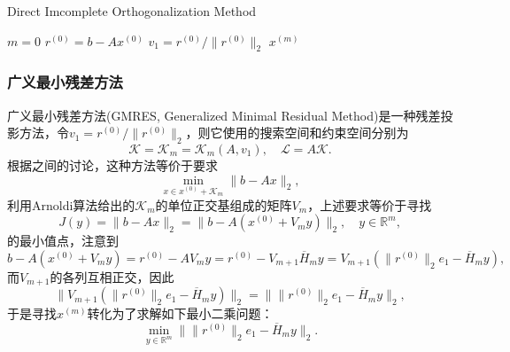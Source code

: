 \documentclass[a4paper,10pt]{ctexart}
\begin{document}
\begin{algorithm}[htbp]
    \caption{Direct Imcomplete Orthogonalization Method}\label{alg:DIOM}
    $ m = 0 $\;
    $ r^{(0)} = b - Ax^{(0)} $\;
    $ v_1 = r^{(0)} / \| r^{(0)} \|_2 $\;
    \Return $ x^{(m)} $\;
\end{algorithm}

\subsubsection{广义最小残差方法}
广义最小残差方法(GMRES, Generalized Minimal Residual Method)是一种残差投影方法，令$ v_1 = r^{(0)} / \| r^{(0)} \|_2 $，则它使用的搜索空间和约束空间分别为
\[
    \mathcal{K} = \mathcal{K}_m = \mathcal{K}_m(A,v_1),\quad \mathcal{L} = A \mathcal{K}.
\]
根据之间的讨论，这种方法等价于要求
\[
    \min_{x\in x^{(0)}+\mathcal{K}_m} \| b - Ax \|_2,
\]
利用Arnoldi算法给出的$ \mathcal{K}_m $的单位正交基组成的矩阵$ V_m $，上述要求等价于寻找
\[
    J(y) = \| b - Ax \|_2 = \| b - A(x^{(0)} + V_m y) \|_2,\quad y\in \mathbb{R}^m,
\]
的最小值点，注意到
\[
    b - A(x^{(0)} + V_m y) = r^{(0)} - AV_m y = r^{(0)} - V_{m+1} \overline{H}_m y = V_{m+1}(\| r^{(0)} \|_2 e_1 - \overline{H}_m y),
\]
而$ V_{m+1} $的各列互相正交，因此
\[
    \| V_{m+1}(\| r^{(0)} \|_2 e_1 - \overline{H}_m y) \|_2 = \|  \| r^{(0)} \|_2 e_1 - \overline{H}_m y \|_2,
\]
于是寻找$ x^{(m)} $转化为了求解如下最小二乘问题：
\begin{equation}
    \min_{y\in \mathbb{R}^m} \|  \| r^{(0)} \|_2 e_1 - \overline{H}_m y \|_2.
\end{equation}
\end{document}
